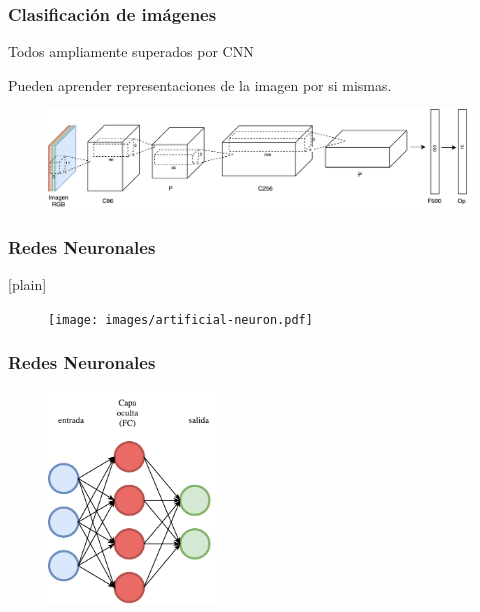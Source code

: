\documentclass{beamer}
\begin{document}
\begin{frame}
\frametitle{Clasificación de imágenes}

Todos ampliamente superados por CNN

Pueden aprender representaciones de la imagen por si mismas.
\begin{figure}
    \centering
    \includegraphics[width=\textwidth]{images/net_example.pdf}
\end{figure}
\end{frame}





\begin{frame}
\frametitle{Redes Neuronales}[plain]
\begin{figure}
    \centering
    \texttt{[image: images/artificial-neuron.pdf]}
\end{figure}
\end{frame}





\begin{frame}
\frametitle{Redes Neuronales}
\begin{figure}
    \centering
    \includegraphics[width=0.4\textwidth]{images/neural-net.pdf}
\end{figure}
\end{frame}
\end{document}
